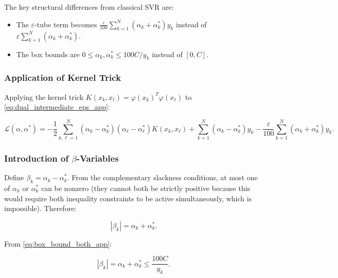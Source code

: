\documentclass[mathematics,article,submit,pdftex,moreauthors]{Definitions/mdpi}
\begin{document}
The key structural differences from classical SVR are:
\begin{itemize}
\item The $\varepsilon$-tube term becomes $\frac{\varepsilon}{100}\sum_{k=1}^N (\alpha_k + \alpha_k^*) y_k$ instead of $\varepsilon\sum_{k=1}^N (\alpha_k + \alpha_k^*)$.
\item The box bounds are $0 \leq \alpha_k, \alpha_k^* \leq 100C/y_k$ instead of $[0, C]$.
\end{itemize}

\subsubsection{Application of Kernel Trick}

Applying the kernel trick $K(x_k, x_\ell) = \varphi(x_k)^T\varphi(x_\ell)$ to \eqref{eq:dual_intermediate_eps_app}:
\begin{linenomath}
\begin{equation}\label{eq:dual_with_kernel_app}
\mathcal{L}(\alpha, \alpha^*) = -\frac{1}{2}\sum_{k,\ell=1}^N (\alpha_k - \alpha_k^*)(\alpha_\ell - \alpha_\ell^*) K(x_k, x_\ell)
+ \sum_{k=1}^N (\alpha_k - \alpha_k^*) y_k - \frac{\varepsilon}{100}\sum_{k=1}^N (\alpha_k + \alpha_k^*) y_k.
\end{equation}
\end{linenomath}

\subsubsection{Introduction of $\beta$-Variables}

Define $\beta_k = \alpha_k - \alpha_k^*$. From the complementary slackness conditions, 
at most one of $\alpha_k$ or $\alpha_k^*$ can be nonzero (they cannot both be strictly positive 
because this would require both inequality constraints to be active simultaneously, which is impossible). Therefore:
\begin{linenomath}
\begin{equation}\label{eq:beta_absolute_value_app}
|\beta_k| = \alpha_k + \alpha_k^*.
\end{equation}
\end{linenomath}

From \eqref{eq:box_bound_both_app}:
\begin{linenomath}
\begin{equation}
|\beta_k| = \alpha_k + \alpha_k^* \leq \frac{100C}{y_k}.
\end{equation}
\end{linenomath}
\end{document}
